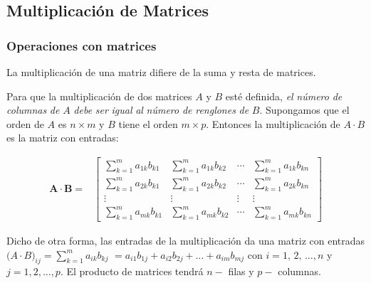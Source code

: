\documentclass[
]{article}
\begin{document}
\hypertarget{multiplicaciuxf3n-de-matrices}{%
\subsection{\texorpdfstring{\textbf{Multiplicación} \textbf{de}
\textbf{Matrices}}{Multiplicación de Matrices}}\label{multiplicaciuxf3n-de-matrices}}

\small

\hypertarget{operaciones-con-matrices-1}{%
\subsubsection{Operaciones con
matrices}\label{operaciones-con-matrices-1}}

La multiplicación de una matriz difiere de la suma y resta de matrices.

Para que la multiplicación de dos matrices \(A\) y \(B\) esté definida,
\emph{el} \emph{número} \emph{de} \emph{columnas} \emph{de} \(A\)
\emph{debe} \emph{ser} \emph{igual} \emph{al} \emph{número} \emph{de}
\emph{renglones} \emph{de} \(B\). Supongamos que el orden de \(A\) es
\(n\times m\) y \(B\) tiene el orden \(m\times p\). Entonces la
multiplicación de \(A\cdot B\) es la matriz con entradas:

\begin{equation}
\begin{array}{cc}
\mathbf{A} \cdot \mathbf{B}   = & 
      \begin{bmatrix}
              \sum_{k=1}^{m}a_{1k}b_{k1}  & \sum_{k=1}^{m}a_{1k}b_{k2}  & \cdots   & \sum_{k=1}^{m}a_{1k}b_{kn}   \\
              \sum_{k=1}^{m}a_{2k}b_{k1} & \sum_{k=1}^{m}a_{2k}b_{k2}  & \cdots   & \sum_{k=1}^{m}a_{2k}b_{kn} \\
              \vdots   & \vdots  & \vdots   & \vdots \\
              \sum_{k=1}^{m}a_{mk}b_{k1}  & \sum_{k=1}^{m}a_{mk}b_{k2}  & \cdots   & \sum_{k=1}^{m}a_{mk}b_{kn} 
        \end{bmatrix}
\end{array}
\end{equation}

Dicho de otra forma, las entradas de la multiplicación da una matriz con
entradas \(\big( A\cdot B\big)_{ij} = \sum_{k=1}^{m}a_{ik}b_{kj}\)
\(=a_{i1}b_{1j}+a_{i2}b_{2j}+\ldots+a_{im}b_{mj}\) con
\(i=1,\,2,\,\ldots,n\) y \(j=1,2,\ldots,p\). El producto de matrices
tendrá \(n-\) filas y \(p-\) columnas.
\end{document}
